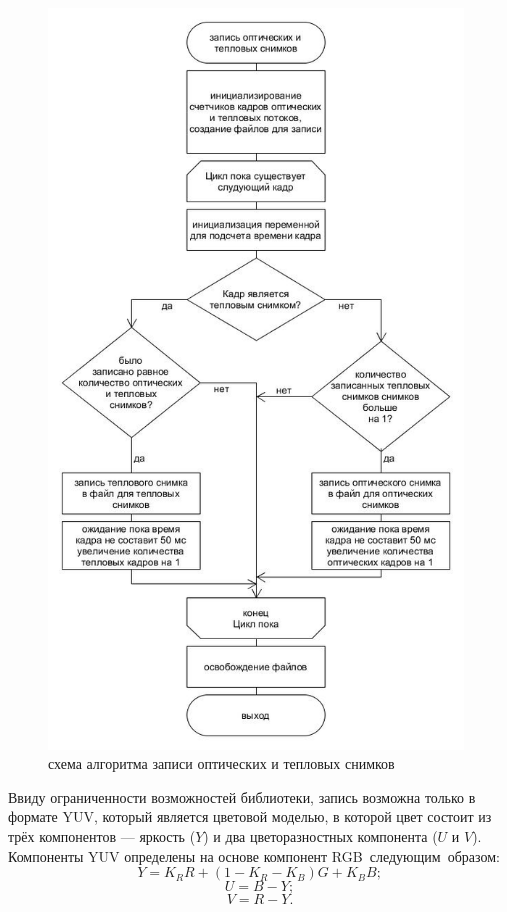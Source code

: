 \documentclass[14pt, a4paper]{extreport}
\begin{document}
	\begin{figure}[h!]
		\centering
		\includegraphics[width = 11cm]{image/chapter_2/loaddata}	
		\caption{схема алгоритма записи оптических и тепловых снимков}
		\label{fig:loaddata}
	\end{figure}

	Ввиду ограниченности возможностей библиотеки, запись возможна только в формате YUV, который является цветовой моделью, в которой цвет состоит из трёх компонентов — яркость ($Y$) и два цветоразностных компонента ($U$ и $V$). Компоненты YUV определены на основе компонент RGB~следующим~образом:
	\begin{equation}
		Y = K_R R + (1 - K_R - K_B)G + K_B B;
		\label{eq:Y_in_YUV}
	\end{equation}
	\begin{equation}
		U = B - Y;
		\label{eq:U_in_YUV}
	\end{equation}
	\begin{equation}
		V = R - Y.
		\label{eq:V_in_YUV}
	\end{equation}
	
\end{document}
